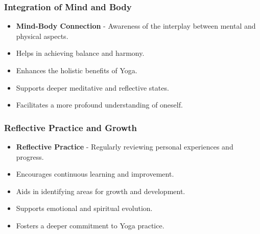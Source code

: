 \begin{frame}[fragile]\frametitle{Integration of Mind and Body}

      \begin{itemize}
		\item \textbf{Mind-Body Connection} - Awareness of the interplay between mental and physical aspects.
		\item Helps in achieving balance and harmony.
		\item Enhances the holistic benefits of Yoga.
		\item Supports deeper meditative and reflective states.
		\item Facilitates a more profound understanding of oneself.
	  \end{itemize}

\end{frame}

\begin{frame}[fragile]\frametitle{Reflective Practice and Growth}

      \begin{itemize}
		\item \textbf{Reflective Practice} - Regularly reviewing personal experiences and progress.
		\item Encourages continuous learning and improvement.
		\item Aids in identifying areas for growth and development.
		\item Supports emotional and spiritual evolution.
		\item Fosters a deeper commitment to Yoga practice.
	  \end{itemize}

\end{frame}

